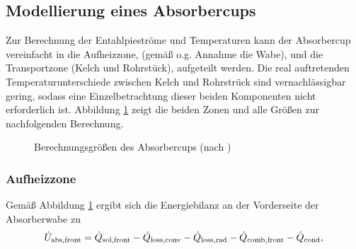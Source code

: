 \subsection{Modellierung eines Absorbercups} \label{subsec_ModellCup}
Zur Berechnung der Entahlpieströme und Temperaturen kann der Absorbercup vereinfacht in die Aufheizzone, (gemäß o.g. Annahme die Wabe), und die Transportzone (Kelch und Rohrstück), aufgeteilt werden.
Die real auftretenden Temperaturunterschiede zwischen Kelch und Rohrstrück sind vernachlässigbar gering, sodass eine Einzelbetrachtung dieser beiden Komponenten nicht erforderlich ist.
Abbildung \ref{fig_AbsorberBerechnung} zeigt die beiden Zonen und alle Größen zur nachfolgenden Berechnung.

\begin{figure}[h!]
    \centering
    \setlength{\fboxsep}{1pt}
    \setlength{\fboxrule}{1pt}
    \caption[Berechnungsgrößen des Absorbercups]{Berechnungsgrößen des Absorbercups (nach \cite{IdingSolarPaces})}
    \label{fig_AbsorberBerechnung}
\end{figure}

\subsubsection*{Aufheizzone} \label{subsubsec_EnergiebilanzAufheizzone}
Gemäß Abbildung \ref{fig_AbsorberBerechnung} ergibt sich die Energiebilanz an der Vorderseite der Absorberwabe zu
\begin{equation} \label{eq_EnergiebilanzWabe}
\dot{U}_{\mathrm{abs}, \mathrm{front}} =\dot{Q}_{\mathrm{sol,front}} - \dot{Q}_{\mathrm{loss,conv}} -  \dot{Q}_{\mathrm{loss,rad}} -\dot{Q}_{\mathrm{comb,front}} - \dot{Q}_{\mathrm{cond}},
\end{equation}

